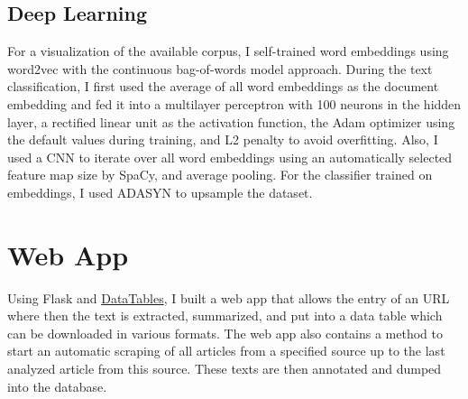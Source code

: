 \subsection{Deep Learning}
  For a visualization of the available corpus, I self-trained word embeddings using word2vec with the continuous bag-of-words model approach.
  During the text classification, I first used the average of all word embeddings as the document embedding and fed it into a multilayer perceptron with 100 neurons in the hidden layer, a rectified linear unit as the activation function, the Adam optimizer using the default values during training, and L2 penalty to avoid overfitting.
  Also, I used a CNN to iterate over all word embeddings using an automatically selected feature map size by SpaCy, and average pooling.
  For the classifier trained on embeddings, I used ADASYN to upsample the dataset.

\section{Web App}
  Using Flask and \href{https://www.datatables.net}{DataTables}, I built a web app that allows the entry of an URL where then the text is extracted, summarized, and put into a data table which can be downloaded in various formats.
  The web app also contains a method to start an automatic scraping of all articles from a specified source up to the last analyzed article from this source. These texts are then annotated and dumped into the database.
